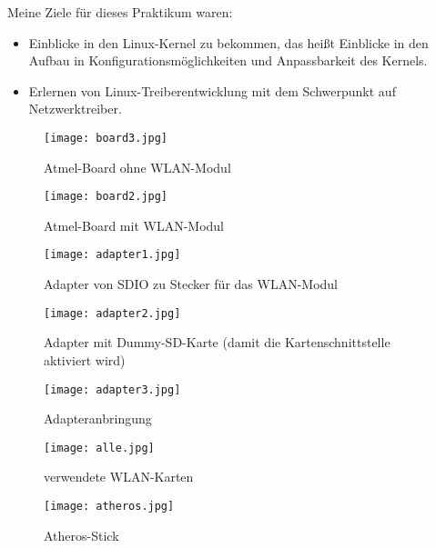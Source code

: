 \documentclass[pdftex,12pt,a4paper]{scrreprt}
\begin{document}
Meine Ziele für dieses Praktikum waren:
\begin{itemize}
 \item Einblicke in den Linux-Kernel zu bekommen, das heißt Einblicke in den Aufbau in Konfigurationsmöglichkeiten und Anpassbarkeit des Kernels.
 \item Erlernen von Linux-Treiberentwicklung mit dem Schwerpunkt auf Netzwerktreiber.
\end{itemize}
\begin{figure}[h] %
    \centering
    \texttt{[image: board3.jpg]}
    \caption{Atmel-Board ohne WLAN-Modul}
\end{figure}
\begin{figure}[h] %
    \centering
    \texttt{[image: board2.jpg]}
    \caption{Atmel-Board mit WLAN-Modul}
\end{figure}
\begin{figure}[h] %
    \centering
    \texttt{[image: adapter1.jpg]}
    \caption{Adapter von SDIO zu Stecker für das WLAN-Modul}
\end{figure}
\begin{figure}[h] %
    \centering
    \texttt{[image: adapter2.jpg]}
    \caption{Adapter mit Dummy-SD-Karte (damit die Kartenschnittstelle aktiviert wird)}
\end{figure}
\begin{figure}[h] %
    \centering
    \texttt{[image: adapter3.jpg]}
    \caption{Adapteranbringung}
\end{figure}
\begin{figure}[h] %
    \centering
    \texttt{[image: alle.jpg]}
    \caption{verwendete WLAN-Karten}
\end{figure}
\begin{figure}[h] %
    \centering
    \texttt{[image: atheros.jpg]}
    \caption{Atheros-Stick}
\end{figure}
\end{document}

